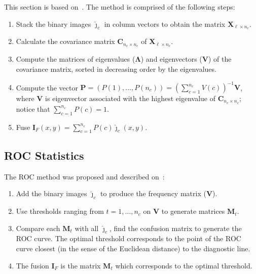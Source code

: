\documentclass[journal]{IEEEtran}
\begin{document}
This section is based on~\cite{n_r,mit}.
The method is comprised of the following steps:
\begin{enumerate}
\item Stack the binary images $\bm{\widehat\jmath}_c$ in column vectors to obtain the matrix $\bm X_{\ell\times n_c}$.
\item Calculate the covariance matrix $\bm C_{n_c\times n_c}$ of $\bm X_{\ell\times n_c}$.
\item Compute the matrices of eigenvalues ($\bm\Lambda$) and eigenvectors ($\bm V$) of the covariance matrix, sorted in decreasing order by the eigenvalues. %
\item Compute the vector $\bm P=(P(1),\dots,P(n_c))=(\sum_{c=1}^{n_c} V(c))^{-1}{\bm V}$, where $\bm V$ is eigenvector associated with the highest eigenvalue of $\bm C_{n_c\times n_c}$; notice that $\sum_{c=1}^{n_c} P(c)=1$.
\item Fuse $\bm I_F(x,y)=\sum_{c=1}^{n_c} P(c)\bm{\widehat\jmath}_c(x,y)$.
\end{enumerate}

\subsection{ROC Statistics}
The ROC method was proposed and described on~\cite{gs}:
\begin{enumerate}
\item Add the binary images $\bm{\widehat\jmath}_c$ to produce the frequency matrix ($\bm V$).
\item Use thresholds ranging from $t=1,\dots,n_c$ on $\bm V$ to generate matrices $\bm M_t$.
\item Compare each $\bm M_t$ with all $\bm{\widehat\jmath}_c$, find the confusion matrix to generate the ROC curve. 
The optimal threshold corresponds to the point of the ROC curve closest (in the sense of the Euclidean distance) to the diagnostic line.
\item The fusion $\bm I_F$ is the matrix $\bm M_t$ which corresponds to the optimal threshold.
\end{enumerate}
\end{document}
